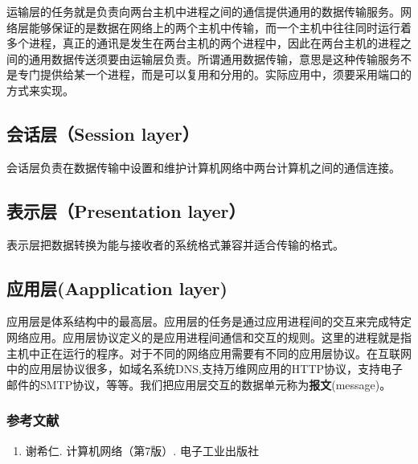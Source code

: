 运输层的任务就是负责向两台主机中进程之间的通信提供通用的数据传输服务。网络层能够保证的是数据在网络上的两个主机中传输，而一个主机中往往同时运行着多个进程，真正的通讯是发生在两台主机的两个进程中，因此在两台主机的进程之间的通用数据传送须要由运输层负责。所谓通用数据传输，意思是这种传输服务不是专门提供给某一个进程，而是可以复用和分用的。实际应用中，须要采用端口的方式来实现。

\subsection{会话层（Session layer）}

会话层负责在数据传输中设置和维护计算机网络中两台计算机之间的通信连接。

\subsection{表示层（Presentation layer）}

表示层把数据转换为能与接收者的系统格式兼容并适合传输的格式。


\subsection{应用层(Aapplication layer)}

应用层是体系结构中的最高层。应用层的任务是通过应用进程间的交互来完成特定网络应用。应用层协议定义的是应用进程间通信和交互的规则。这里的进程就是指主机中正在运行的程序。对于不同的网络应用需要有不同的应用层协议。在互联网中的应用层协议很多，如域名系统DNS,支持万维网应用的HTTP协议，支持电子邮件的SMTP协议，等等。我们把应用层交互的数据单元称为\textbf{报文}(message)。




\subsubsection{参考文献}
\begin{enumerate}
\item 谢希仁. 计算机网络（第7版）. 电子工业出版社
\end{enumerate}